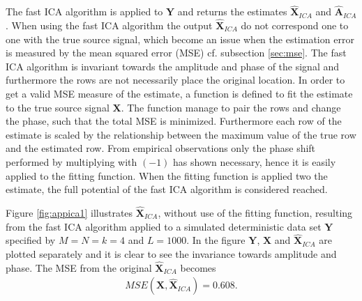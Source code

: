 The fast ICA algorithm is applied to $\textbf{Y}$ and returns the estimates $\hat{\textbf{X}}_{ICA}$ and $\hat{\textbf{A}}_{ICA}$. 
When using the fast ICA algorithm the output $\hat{\textbf{X}}_{ICA}$ do not correspond one to one with the true source signal, which become an issue when the estimation error is measured by the mean squared error (MSE) cf. subsection \ref{sec:mse}.  The fast ICA algorithm is invariant towards the amplitude and phase of the signal and furthermore the rows are not necessarily place the original location. 
In order to get a valid MSE measure of the estimate, a function is defined to fit the estimate to the true source signal $\textbf{X}$. The function manage to pair the rows and change the phase, such that the total MSE is minimized. Furthermore each row of the estimate is scaled by the relationship between the maximum value of the true row and the estimated row.
From empirical observations only the phase shift performed by multiplying with $(-1)$ has shown necessary, hence it is easily applied to the fitting function.
When the fitting function is applied two the estimate, the full potential of the fast ICA algorithm is considered reached.       

Figure \ref{fig:appica1} illustrates $\hat{\textbf{X}}_{ICA}$, without use of the fitting function, resulting from the fast ICA algorithm applied to a simulated deterministic data set $\textbf{Y}$ specified by $M=N=k=4$ and $L=1000$. In the figure $\textbf{Y}$, $\textbf{X}$ and $\hat{\textbf{X}}_{ICA}$ are plotted separately and it is clear to see the invariance towards amplitude and phase.
The MSE from the original $\hat{\textbf{X}}_{ICA}$ becomes
\begin{align*}
MSE(\textbf{X},\hat{\textbf{X}}_{ICA}) = 0.608.
\end{align*}

